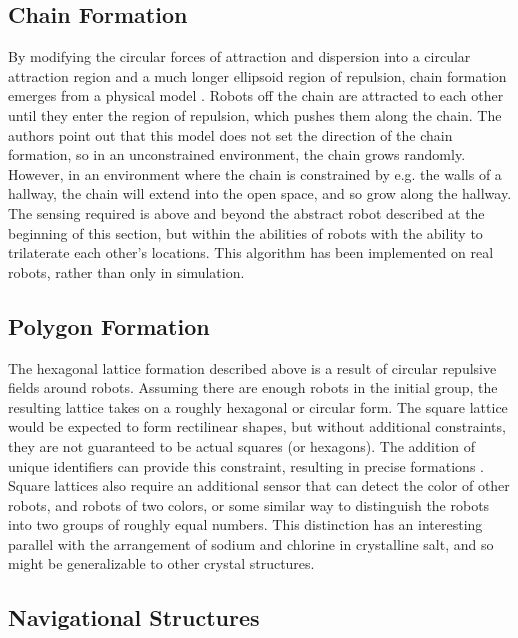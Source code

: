 \documentclass[]{article}
\begin{document}
\subsection{Chain Formation}

By modifying the circular forces of attraction and dispersion into a circular attraction region and a much longer ellipsoid region of repulsion, chain formation emerges from a physical model \cite{maxim2009robotic}. 
Robots off the chain are attracted to each other until they enter the region of repulsion, which pushes them along the chain. 
The authors point out that this model does not set the direction of the chain formation, so in an unconstrained environment, the chain grows randomly. 
However, in an environment where the chain is constrained by e.g. the walls of a hallway, the chain will extend into the open space, and so grow along the hallway. 
The sensing required is above and beyond the abstract robot described at the beginning of this section, but within the abilities of robots with the ability to trilaterate each other's locations. 
This algorithm has been implemented on real robots, rather than only in simulation.  

\subsection{Polygon Formation}

The hexagonal lattice formation described above is a result of circular repulsive fields around robots. 
Assuming there are enough robots in the initial group, the resulting lattice takes on a roughly hexagonal or circular form. 
The square lattice would be expected to form rectilinear shapes, but without additional constraints, they are not guaranteed to be actual squares (or hexagons).
The addition of unique identifiers can provide this constraint, resulting in precise formations \cite{spears1999using}. 
Square lattices also require an additional sensor that can detect the color of other robots, and robots of two colors, or some similar way to distinguish the robots into two groups of roughly equal numbers. 
This distinction has an interesting parallel with the arrangement of sodium and chlorine in crystalline salt, and so might be generalizable to other crystal structures. 

\subsection{Navigational Structures}
\end{document}
